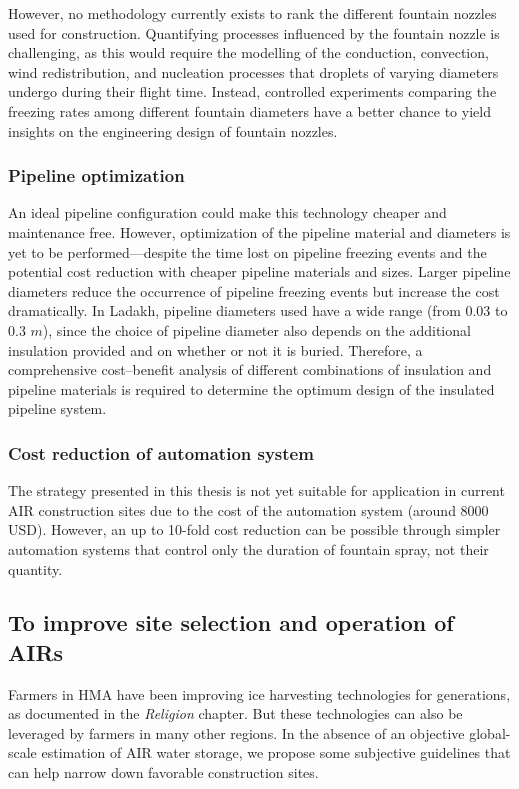 However, no methodology currently exists to rank the different fountain nozzles used for construction. Quantifying
processes influenced by the fountain nozzle is challenging, as this would require the modelling of the conduction,
convection, wind redistribution, and nucleation processes that droplets of varying diameters undergo during
their flight time. Instead, controlled experiments comparing the freezing rates among different fountain
diameters have a better chance to yield insights on the engineering design of fountain nozzles.

\subsubsection{Pipeline optimization}

An ideal pipeline configuration could make this technology cheaper and maintenance free. However, optimization
of the pipeline material and diameters is yet to be performed---despite the time lost on pipeline freezing
events and the potential cost reduction with cheaper pipeline materials and sizes. Larger pipeline diameters
reduce the occurrence of pipeline freezing events but increase the cost dramatically. In Ladakh, pipeline
diameters used have a wide range (from 0.03 to 0.3 $m$), since the choice of pipeline diameter also depends on
the additional insulation provided and on whether or not it is buried. Therefore, a comprehensive cost--benefit
analysis of different combinations of insulation and pipeline materials is required to determine the optimum
design of the insulated pipeline system.

\subsubsection{Cost reduction of automation system}

The strategy presented in this thesis is not yet suitable for application in current \ac{AIR} construction sites due to the cost of the
automation system (around 8000 USD). However, an up to 10-fold cost reduction can be possible through
simpler automation systems that control only the duration of fountain spray, not their quantity. 

\subsection{To improve site selection and operation of AIRs }

Farmers in \ac{HMA} have been improving ice harvesting technologies for generations, as documented in
the \textit{Religion} chapter. But these technologies can also be leveraged by farmers in many other regions. In
the absence of an objective global-scale estimation of \ac{AIR} water storage, we propose some subjective guidelines
that can help narrow down favorable construction sites.

